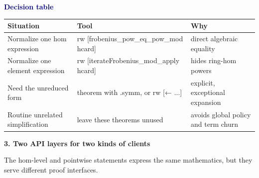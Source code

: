 \documentclass[10pt]{article}
\newcommand{\code}[1]{{\leanfont #1}}
\newcommand{\decision}[1]{\textcolor{navy}{\bfseries #1}}
\begin{document}
\vspace{2mm}
\decision{Decision table}
\begin{center}
\renewcommand{\arraystretch}{1.35}
\begin{tabular}{p{.27\linewidth}p{.28\linewidth}p{.34\linewidth}}
\toprule
Situation & Tool & Why\\ \midrule
Normalize one hom expression & \code{rw [frobenius\_pow\_eq\_pow\_mod hcard]} & direct algebraic equality\\
Normalize one element expression & \code{rw [iterateFrobenius\_mod\_apply hcard]} & hides ring-hom powers\\
Need the unreduced form & theorem with \code{.symm}, or \code{rw [← ...]} & explicit, exceptional expansion\\
Routine unrelated simplification & leave these theorems unused & avoids global policy and term churn\\
\bottomrule
\end{tabular}
\end{center}
\newpage

\begin{center}
{\Large\bfseries\color{navy} 3. Two API layers for two kinds of clients}
\end{center}

The hom-level and pointwise statements express the same mathematics, but they serve different proof interfaces.

\begin{center}
\end{center}
\end{document}
